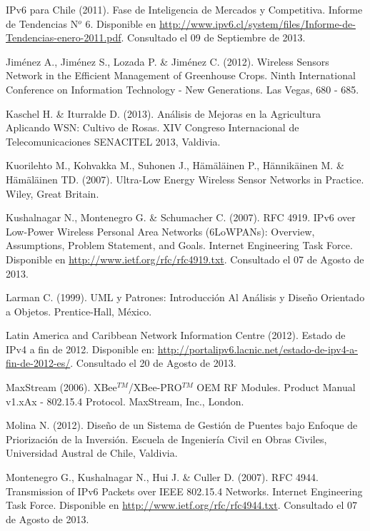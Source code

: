 \begin{spacing}{1.0}
\begin{thebibliography}{99}
IPv6 para Chile (2011).
\newblock Fase de Inteligencia de Mercados y Competitiva. Informe de Tendencias N$^{o}$ 6.
\newblock Disponible en \url{http://www.ipv6.cl/system/files/Informe-de-Tendencias-enero-2011.pdf}.
\newblock Consultado el 09 de Septiembre de 2013.

Jiménez A., Jiménez S., Lozada P. \& Jiménez C. (2012).
\newblock Wireless Sensors Network in the Efficient Management of Greenhouse Crops.
 Ninth International Conference on Information Technology - New Generations.
\newblock Las Vegas, 680 - 685. 

Kaschel H. \& Iturralde D. (2013).
\newblock Análisis de Mejoras en la Agricultura Aplicando WSN: Cultivo de Rosas.
\newblock XIV Congreso Internacional de Telecomunicaciones SENACITEL 2013,
\newblock Valdivia. 

Kuorilehto M., Kohvakka M., Suhonen J., Hämäläinen P., Hännikäinen M. \& Hämäläinen TD. (2007).
\newblock Ultra-Low Energy Wireless Sensor Networks in Practice.
\newblock Wiley, Great Britain.

Kushalnagar N., Montenegro G. \& Schumacher C. (2007).
\newblock RFC 4919. IPv6 over Low-Power Wireless Personal Area Networks (6LoWPANs): Overview, Assumptions, Problem Statement, and Goals. Internet Engineering Task Force.
\newblock Disponible en \url{http://www.ietf.org/rfc/rfc4919.txt}.
\newblock Consultado el 07 de Agosto de 2013.

Larman C. (1999).
\newblock UML y Patrones: Introducción Al Análisis y Diseño Orientado a Objetos.
\newblock Prentice-Hall, México.

Latin America and Caribbean Network Information Centre (2012).
\newblock Estado de IPv4 a fin de 2012.
\newblock Disponible en: \url{http://portalipv6.lacnic.net/estado-de-ipv4-a-fin-de-2012-es/}.
\newblock Consultado el 20 de Agosto de 2013.

MaxStream (2006).
\newblock XBee$^{TM}$/XBee-PRO$^{TM}$ OEM RF Modules. Product Manual v1.xAx - 802.15.4 Protocol.
\newblock MaxStream, Inc., London.

Molina N. (2012).
\newblock Diseño de un Sistema de Gestión de Puentes bajo Enfoque de Priorización de la Inversión.
\newblock Escuela de Ingeniería Civil en Obras Civiles,
\newblock Universidad Austral de Chile, Valdivia.

Montenegro G., Kushalnagar N., Hui J. \& Culler D. (2007).
\newblock RFC 4944. Transmission of IPv6 Packets over IEEE 802.15.4 Networks. Internet Engineering Task Force.
\newblock Disponible en \url{http://www.ietf.org/rfc/rfc4944.txt}.
\newblock Consultado el 07 de Agosto de 2013.


\end{thebibliography}
\end{spacing}
